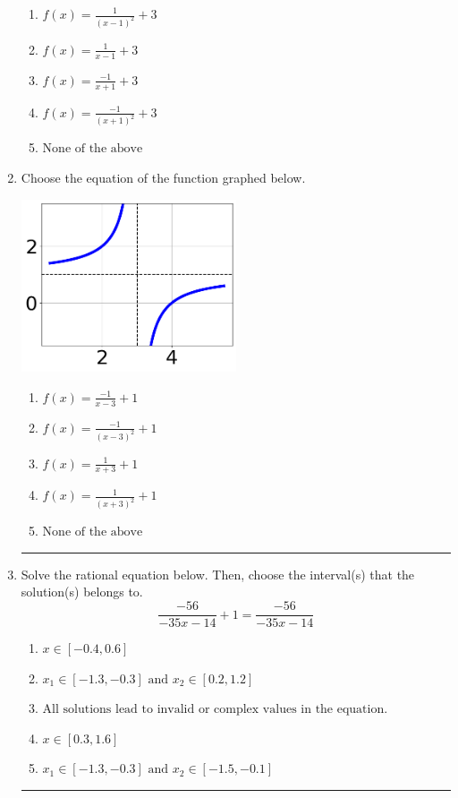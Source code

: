 \documentclass[14pt]{extbook}
\newcommand{\litem}[1]{\item#1\hspace*{-1cm}\rule{\textwidth}{0.4pt}}
\begin{document}
\begin{enumerate}
{\begin{center}
\end{center}
\begin{enumerate}[label=\Alph*.]
\item \( f(x) = \frac{1}{(x - 1)^2} + 3 \)
\item \( f(x) = \frac{1}{x - 1} + 3 \)
\item \( f(x) = \frac{-1}{x + 1} + 3 \)
\item \( f(x) = \frac{-1}{(x + 1)^2} + 3 \)
\item \( \text{None of the above} \)

\end{enumerate} }
\litem{
Choose the equation of the function graphed below.
\begin{center}
    \includegraphics[width=0.5\textwidth]{../Figures/rationalGraphToEquationB.png}
\end{center}
\begin{enumerate}[label=\Alph*.]
\item \( f(x) = \frac{-1}{x - 3} + 1 \)
\item \( f(x) = \frac{-1}{(x - 3)^2} + 1 \)
\item \( f(x) = \frac{1}{x + 3} + 1 \)
\item \( f(x) = \frac{1}{(x + 3)^2} + 1 \)
\item \( \text{None of the above} \)

\end{enumerate} }
\litem{
Solve the rational equation below. Then, choose the interval(s) that the solution(s) belongs to.\[ \frac{-56}{-35x -14} + 1 = \frac{-56}{-35x -14} \]\begin{enumerate}[label=\Alph*.]
\item \( x \in [-0.4,0.6] \)
\item \( x_1 \in [-1.3, -0.3] \text{ and } x_2 \in [0.2,1.2] \)
\item \( \text{All solutions lead to invalid or complex values in the equation.} \)
\item \( x \in [0.3,1.6] \)
\item \( x_1 \in [-1.3, -0.3] \text{ and } x_2 \in [-1.5,-0.1] \)


\end{enumerate}}
\end{enumerate}
\end{document}
